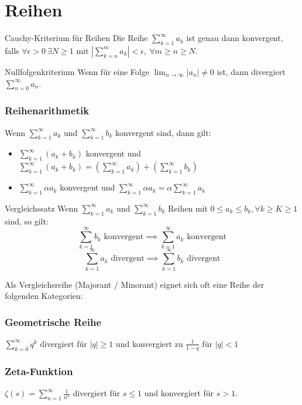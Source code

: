 \documentclass[a4paper,10pt]{article}
\def\limn{\lim_{n\to \infty}}
\def\sumk{\sum_{k=1}^\infty}
\def\sumn{\sum_{n=0}^\infty}
\begin{document}
\section{Reihen}

\begin{mainbox}{Cauchy-Kriterium für Reihen}
Die Reihe $\sumk a_k$ ist genau dann konvergent, falls $\forall \epsilon > 0 \ \exists N \ge 1$ mit $| \sum_{k=n}^m a_k | < \epsilon, \ \forall m \ge n \ge N$.
\end{mainbox}

\begin{subbox}{Nullfolgenkriterium}
 Wenn für eine Folge $\limn |a_n| \ne 0$ ist, dann divergiert $\sumn a_n$.
\end{subbox}


\subsubsection{Reihenarithmetik}
Wenn $\sumk a_k$ und $\sumk b_k$ konvergent sind, dann gilt:
\begin{itemize}
 \item $\sumk (a_k + b_k)$ konvergent und $\sumk (a_k + b_k) = \left( \sumk a_k \right) + \left( \sumk b_k \right)$
 \item $\sumk \alpha a_k$ konvergent und $\sumk \alpha a_k = \alpha \sumk a_k$
\end{itemize}


\begin{mainbox}{Vergleichssatz}
Wenn $\sumk a_k$ und $\sumk b_k$ Reihen mit $0 \le a_k \le b_k, \forall k \ge K \ge 1$ sind, so gilt:
$$\sumk b_k \text{ konvergent} \implies \sumk a_k \text{ konvergent}$$ 
$$\sumk a_k \text{ divergent} \implies \sumk b_k \text{ divergent}$$ 
\end{mainbox}

Als Vergleichsreihe (Majorant / Minorant) eignet sich oft eine Reihe der folgenden Kategorien:
\subsubsection{Geometrische Reihe} 
$\sum_{k=0}^\infty q^k$ divergiert für $|q| \ge 1$ und konvergiert zu $\frac{1}{1 - q}$ für $|q| < 1$
\subsubsection{Zeta-Funktion}
$\zeta(s) = \sum_{n=1}^\infty \frac{1}{n^s}$ divergiert für $s \le 1$ und konvergiert für $s > 1$.
\end{document}
